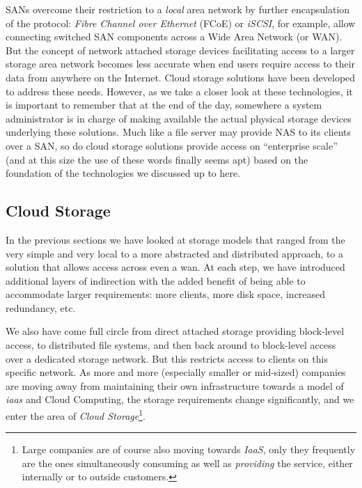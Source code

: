 SANs overcome their restriction to a {\em local} area
network by further encapsulation of the protocol: {\em
Fibre Channel over Ethernet} (FCoE) or {\em
iSCSI}, for example, allow connecting
switched SAN components across a Wide Area
Network (or WAN).  But the
concept of network attached storage devices
facilitating access to a larger storage area network
becomes less accurate when end users require access to
their data from anywhere on the Internet.  Cloud
storage solutions have been developed to address these
needs.  However, as we take a closer look at these
technologies, it is important to remember that at the
end of the day, somewhere a system administrator is in
charge of making available the actual physical storage
devices underlying these solutions.  Much like a file
server may provide NAS to its clients over a SAN, so
do cloud storage solutions provide access on
``enterprise scale'' (and at this size the use of
these words finally seems apt) based on the foundation
of the technologies we discussed up to here.

\subsection{Cloud Storage}
\label{file systems:storage-models:cloud}

In the previous sections we have looked at storage
models that ranged from the very simple and very local
to a more abstracted and distributed approach, to a
solution that allows access across even a \gls{wan}.
At each step, we have introduced additional layers of
indirection with the added benefit of being able to
accommodate larger requirements: more clients, more
disk space, increased redundancy, etc.

We also have come full circle from direct attached
storage providing block-level access, to distributed
file systems, and then back around to block-level
access over a dedicated storage network.  But this
restricts access to clients on this specific network.
As more and more (especially smaller or mid-sized)
companies are moving away from maintaining their own
infrastructure towards a model of {\em
\gls{iaas}} and
Cloud Computing, the storage
requirements change significantly, and we enter the
area of {\em Cloud Storage}\footnote{Large companies are of
course also moving towards {\em IaaS}, only they
frequently are the ones simultaneously consuming as
well as {\em providing} the service, either internally
or to outside customers.}.

